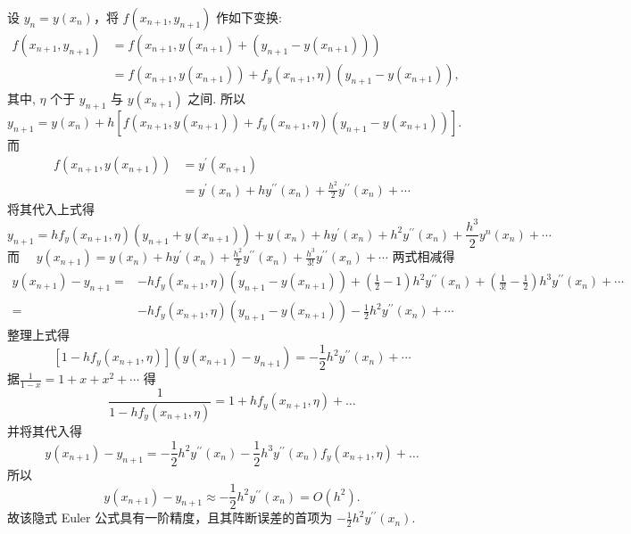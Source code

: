 设 $y_{n}=y\left(x_{n}\right)$，将 $ f\left(x_{n+1}, y_{n+1}\right) $ 作如下变换:
$$
\begin{aligned}
f\left(x_{n+1}, y_{n+1}\right) & =f\left(x_{n+1}, y\left(x_{n+1}\right)+\left(y_{n+1}-y\left(x_{n+1}\right)\right)\right) \\
& =f\left(x_{n+1}, y\left(x_{n+1}\right)\right)+f_{y}\left(x_{n+1}, \eta\right)\left(y_{n+1}-y\left(x_{n+1}\right)\right),
\end{aligned}
$$
其中, $ \eta $ 个于 $ y_{n+1} $ 与 $ y\left(x_{n+1}\right) $ 之间. 所以
$$
y_{n+1}=y\left(x_{n}\right)+h\left[f\left(x_{n+1}, y\left(x_{n+1}\right)\right)+f_{y}\left(x_{n+1}, \eta\right)\left(y_{n+1}-y\left(x_{n+1}\right)\right)\right] .
$$
而
$$
\begin{aligned}
f\left(x_{n+1}, y\left(x_{n+1}\right)\right) & =y^{\prime}\left(x_{n+1}\right) \\
& =y^{\prime}\left(x_{n}\right)+h y^{\prime \prime}\left(x_{n}\right)+\frac{h^{2}}{2} y^{\prime \prime}\left(x_{n}\right)+\cdots
\end{aligned}
$$
将其代入上式得
$$
y_{n+1}=h f_{y}\left(x_{n+1}, \eta\right)\left(y_{n+1}+y\left(x_{n+1}\right)\right)+y\left(x_{n}\right)+h y^{\prime}\left(x_{n}\right)+h^{2} y^{\prime \prime}\left(x_{n}\right)+\frac{h^{3}}{2} y^{n}\left(x_{n}\right)+\cdots
$$
而 $ \quad y\left(x_{n+1}\right)=y\left(x_{n}\right)+h y^{\prime}\left(x_{n}\right)+\frac{h^{2}}{2} y^{\prime \prime}\left(x_{n}\right)+\frac{h^{3}}{3!} y^{\prime \prime}\left(x_{n}\right)+\cdots $
两式相减得
$$
\begin{aligned}
y\left(x_{n+1}\right)-y_{n+1}= & -h f_{y}\left(x_{n+1}, \eta\right)\left(y_{n+1}-y\left(x_{n+1}\right)\right)+\left(\frac{1}{2}-1\right) h^{2} y^{\prime \prime}\left(x_{n}\right) +\left(\frac{1}{3!}-\frac{1}{2}\right) h^{3} y^{\prime \prime}\left(x_{n}\right)+\cdots \\
= & -h f_{y}\left(x_{n+1}, \eta\right)\left(y_{n+1}-y\left(x_{n+1}\right)\right)-\frac{1}{2} h^{2} y^{\prime \prime}\left(x_{n}\right)+\cdots
\end{aligned}
$$
整理上式得
$$
\left[1-h f_{y}\left(x_{n+1}, \eta\right)\right]\left(y\left(x_{n+1}\right)-y_{n+1}\right)=-\frac{1}{2} h^{2} y^{\prime \prime}\left(x_{n}\right)+\cdots
$$
据$\frac{1}{1-x}=1+x+x^{2}+\cdots$ 得
$$
\frac{1}{1-h f_{y}\left(x_{n+1}, \eta\right)}=1+h f_{y}\left(x_{n+1}, \eta\right)+\ldots
$$
并将其代入得
$$
y\left(x_{n+1}\right)-y_{n+1}=-\frac{1}{2} h^{2} y^{\prime \prime}\left(x_{n}\right)-\frac{1}{2} h^{3} y^{\prime \prime}\left(x_{n}\right) f_{y}\left(x_{n+1}, \eta\right)+\ldots
$$
所以
$$
y\left(x_{n+1}\right)-y_{n+1} \approx-\frac{1}{2} h^{2} y^{\prime \prime}\left(x_{n}\right)=O\left(h^{2}\right) .
$$
故该隐式 Euler 公式具有一阶精度，且其阵断误差的首项为 $ -\frac{1}{2} h^{2} y^{\prime \prime}\left(x_{n}\right) $.


